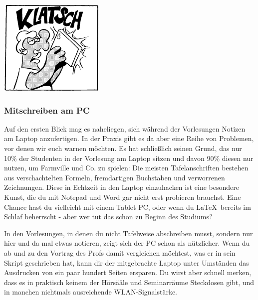 \begin{center}%
\includegraphics[width = 0.7\linewidth]{bilder/comics/otto1_3.png}
\end{center}
\subsubsection{Mitschreiben am PC}
Auf den ersten Blick mag es naheliegen, sich während der Vorlesungen Notizen 
am Laptop anzufertigen. In der Praxis gibt es da aber eine Reihe von Problemen, 
vor denen wir euch warnen möchten. Es hat schließlich seinen Grund, das nur 
10\% der Studenten in der Vorlesung am Laptop sitzen und davon 90\% diesen nur 
nutzen, um Farmville und Co. zu spielen: Die meisten Tafelanschriften bestehen 
aus verschachtelten Formeln, fremdartigen Buchstaben und verworrenen 
Zeichnungen. Diese in Echtzeit in den Laptop einzuhacken ist eine besondere
 Kunst, die du mit Notepad und Word gar nicht erst probieren brauchst. Eine 
 Chance hast du vielleicht mit einem Tablet PC, oder wenn du \LaTeX\ bereits 
 im Schlaf beherrscht - aber wer tut das schon zu Beginn des Studiums?

In den Vorlesungen, in denen du nicht Tafelweise abschreiben musst, sondern 
nur hier und da mal etwas notieren, zeigt sich der PC schon als nützlicher. 
Wenn du ab und zu den Vortrag des Profs damit vergleichen möchtest, was er 
in sein Skript geschrieben hat, kann dir der mitgebrachte Laptop unter 
Umständen das Ausdrucken von ein paar hundert Seiten ersparen. Du wirst aber 
schnell merken, dass es in praktisch keinem der Hörsääle und Seminarräume 
Steckdosen gibt, und in manchen nichtmals ausreichende WLAN-Signalstärke.


